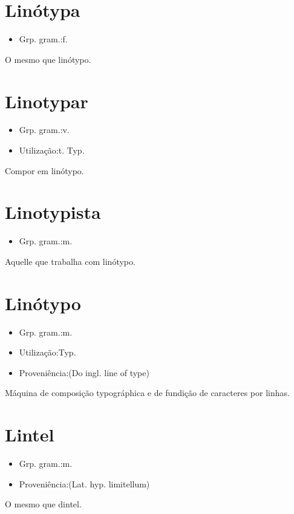 \section{Linótypa}
\begin{itemize}
\item {Grp. gram.:f.}
\end{itemize}
O mesmo que \textunderscore linótypo\textunderscore .
\section{Linotypar}
\begin{itemize}
\item {Grp. gram.:v.}
\end{itemize}
\begin{itemize}
\item {Utilização:t. Typ.}
\end{itemize}
Compor em linótypo.
\section{Linotypista}
\begin{itemize}
\item {Grp. gram.:m.}
\end{itemize}
Aquelle que trabalha com linótypo.
\section{Linótypo}
\begin{itemize}
\item {Grp. gram.:m.}
\end{itemize}
\begin{itemize}
\item {Utilização:Typ.}
\end{itemize}
\begin{itemize}
\item {Proveniência:(Do ingl. \textunderscore line of type\textunderscore )}
\end{itemize}
Máquina de composição typográphica e de fundição de caracteres por linhas.
\section{Lintel}
\begin{itemize}
\item {Grp. gram.:m.}
\end{itemize}
\begin{itemize}
\item {Proveniência:(Lat. hyp. \textunderscore limitellum\textunderscore )}
\end{itemize}
O mesmo que \textunderscore dintel\textunderscore .
